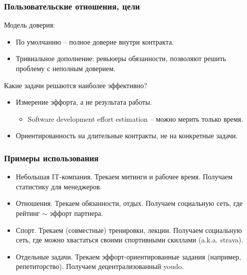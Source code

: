 \documentclass[11pt,handout,pdf,hyperref={unicode}]{beamer}
\begin{document}
\begin{frame}
  \frametitle{Пользовательские отношения, цели}

  Модель доверия:
  \begin{itemize}
  \item По умолчанию -- полное доверие внутри контракта.
  \item Тривиальное дополнение: ревьюеры обязанности, позволяют решить
    проблему с неполным доверием.
  \end{itemize}

  Какие задачи решаются наиболее эффективно?
  \begin{itemize}
  \item Измерение эффорта, а не результата работы.
    \begin{itemize}
    \item Software development effort estimation -- можно мерить только время.
    \end{itemize}
  \item Ориентированность на длительные контракты, не на конкретные задачи.
  \end{itemize}

\end{frame}

\begin{frame}
  \frametitle{Примеры использования}

  \begin{itemize}
    \item Небольшая IT-компания. Трекаем митинги и рабочее
      время. Получаем статистику для менеджеров.
    \item Отношения. Трекаем обязанности, отдых. Получаем социальную
      сеть, где рейтинг $\sim$ эффорт партнера.
    \item Спорт. Трекаем (совместные) тренировки, лекции. Получаем
      социальную сеть, где можно хвастаться своими спортивными
      скиллами (a.k.a. strava).
    \item Отдельные задачи. Трекаем эффорт-ориентированные задания
      (например, репетиторство). Получаем децентрализованный youdo.
  \end{itemize}
\end{frame}
\end{document}
